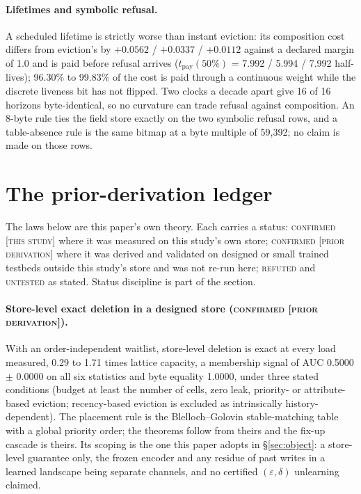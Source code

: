 \documentclass{article} %
\begin{document}
\paragraph{Lifetimes and symbolic refusal.} A scheduled lifetime is strictly worse than instant
eviction: its composition cost differs from eviction's by $+0.0562$ / $+0.0337$ / $+0.0112$ against a
declared margin of 1.0 and is paid before refusal arrives ($t_{\text{pay}}(50\%)$ = 7.992 / 5.994 /
7.992 half-lives); 96.30\% to 99.83\% of the cost is paid through a continuous weight while the
discrete liveness bit has not flipped. %
Two clocks a decade apart give 16 of 16 horizons byte-identical, so no curvature can trade refusal
against composition. An 8-byte rule ties the field store exactly on the two symbolic refusal rows,
and a table-absence rule is the same bitmap at a byte multiple of 59,392; no claim is made on those
rows. %

\section{The prior-derivation ledger}
\label{app:shorts}

The laws below
are this paper's own theory. Each carries a status: \textsc{confirmed [this study]} where it was
measured on this study's own store; \textsc{confirmed [prior derivation]} where it was derived and
validated on designed or small trained testbeds outside this study's store and was not re-run
here; \textsc{refuted} and \textsc{untested} as stated. Status discipline is part of the section.


\paragraph{Store-level exact deletion in a designed store (\textsc{confirmed [prior
derivation]}).} With an order-independent waitlist, store-level deletion is exact at every load
measured, 0.29 to 1.71 times lattice capacity, a membership signal of AUC 0.5000 $\pm$ 0.0000 on all
six statistics and byte equality 1.0000, under three stated conditions (budget at least the number
of cells, zero leak, priority- or attribute-based eviction; recency-based eviction is excluded as
intrinsically history-dependent). %
The placement rule is the Blelloch--Golovin stable-matching table with a global priority order;
the theorems follow from theirs and the fix-up cascade is theirs. Its scoping is the one this
paper adopts in \S\ref{sec:object}: a store-level guarantee only, the frozen encoder and any
residue of past writes in a learned landscape being separate channels, and no certified
$(\varepsilon,\delta)$ unlearning claimed. %
\end{document}
